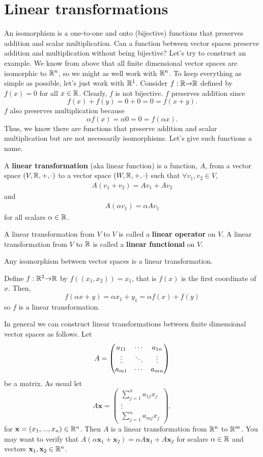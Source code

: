 
\section{Linear transformations}

An isomorphism is a one-to-one and onto (bijective) functions that
preserves addition and scalar multiplication. Can a function between
vector spaces preserve addition and multiplication without being
bijective?  Let's try to construct an example. We know from above that
all finite dimensional vector spaces are isomorphic to $\mathbb{R}^n$, so we
might as well work with $\mathbb{R}^n$. To keep everything as simple as
possible, let's just work with $\mathbb{R}^1$. Consider $f:\mathbb{R} {\rightarrow} \mathbb{R}$ defined
by $f(x) = 0$ for all $x \in \mathbb{R}$. Clearly, $f$ is not bijective. $f$
preserves addition since
\[ f(x) + f(y) = 0 + 0 = 0 = f(x+y). \]
$f$ also preserves multiplication because 
\[ \alpha f(x) = \alpha 0 = 0 = f(\alpha x). \]
Thus, we know there are functions that preserve addition and scalar
multiplication but are not necessarily isomorphisms. Let's give such
functions a name. 
\begin{definition}
  A \textbf{linear transformation} (aka linear function) is a
  function, $A$, from a vector space $(V,\mathbb{R},+,\cdot)$ to a vector
  space $(W,\mathbb{R},+,\cdot)$ such that $\forall v_1, v_2 \in V$,
  \begin{align*}
    A (v_1 + v_2) = A v_1 + A v_2 
  \end{align*}
  and 
  \begin{align*}
    A (\alpha v_1) = \alpha A v_1
  \end{align*}
  for all scalars $\alpha \in \mathbb{R}$.   

  A linear transformation from $V$ to $V$ is called a \textbf{linear
    operator} on $V$. A linear transformation from $V$ to $\mathbb{R}$ is
  called a \textbf{linear functional} on $V$.
\end{definition}
Any isomorphism between vector spaces is a linear
transformation. 
\begin{example}
  Define $f: \mathbb{R}^2 {\rightarrow} \mathbb{R}$ by $f( (x_1, x_2) ) = x_1$, that is $f(x)$ is
  the first coordinate of $x$. Then,
  \[ f(\alpha x + y) = \alpha x_1 + y_1 = \alpha f(x) + f(y) \]
  so $f$ is a linear transformation.
\end{example}

In general we can construct linear transformations between finite
dimensional vector spaces as follows. Let 
\[ A = \begin{pmatrix} {a}_{11} & \cdots & {a}_{1n} \\ \vdots & \ddots & \vdots \\ {a}_{m1} & \cdots & {a}_{mn} \end{pmatrix} \]
be a matrix. As usual let 
\[ A\mathbf{x} = 
\begin{pmatrix} 
  \sum_{j=1}^n a_{1j} x_j \\
  \vdots \\
  \sum_{j=1}^n a_{mj} x_j 
\end{pmatrix}, \] for $\mathbf{x} = (x_1, ..., x_n) \in \mathbb{R}^n$. Then
$A$ is a linear transformation from $\mathbb{R}^n$ to $\mathbb{R}^m$. You may want to
verify that $A(\alpha \mathbf{x}_1 + \mathbf{x}_2 ) = \alpha A
\mathbf{x}_1 + A \mathbf{x}_2$ for scalars $\alpha \in \mathbb{R}$ and
vectors $\mathbf{x}_1, \mathbf{x}_2 \in \mathbb{R}^n$. 

